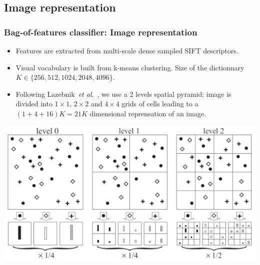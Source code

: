 \documentclass{beamer}
\def\etal{\emph{et al}.}
\begin{document}
\subsection{Image representation}

\begin{frame}
\frametitle{Bag-of-features classifier: Image representation}

\begin{itemize}
\item Features are extracted from multi-scale dense sampled SIFT descriptors.
\item Visual vocabulary is built from k-means clustering. Size of the dictionnary $K \in \{256, 512, 1024, 2048, 4096\}$.
\item Following Lazebnik~\etal~, we use a 2 levels spatial pyramid: image is divided into $1 \times 1$, $2 \times 2$ and $4 \times 4$
grids of cells leading to a $(1+4+16)K = 21K$ dimensional reprensation of an image.

\end{itemize}

\center
\includegraphics[width=0.5\linewidth]{figs/spatial_pyramid.png}

\end{frame}

\end{document}
